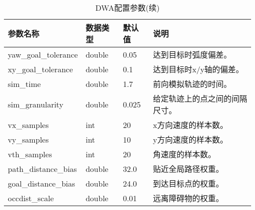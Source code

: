     \begin{table}[th]
      \caption{DWA配置参数(续)}  
      \begin{center}  
      \begin{tabular}{|l|l|l|p{8cm}|}  
      \hline  
      参数名称 & 数据类型 & 默认值 & 说明  \\ \hline  
      yaw\_goal\_tolerance & double & 0.05 & 达到目标时弧度偏差。 \\  \hline  
      xy\_goal\_tolerance & double & 0.1 & 达到目标时x/y轴的偏差。 \\  \hline  
      sim\_time & double & 1.7 & 前向模拟轨迹的时间。 \\  \hline  
      sim\_granularity & double & 0.025 & 给定轨迹上的点之间的间隔尺寸。 \\  \hline  
      vx\_samples & int & 20 & x方向速度的样本数。 \\  \hline  
      vy\_samples & int & 10 & y方向速度的样本数。 \\  \hline  
      vth\_samples & int & 20 & 角速度的样本数。 \\  \hline  
      path\_distance\_bias & double & 32.0 & 贴近全局路径权重。 \\  \hline  
      goal\_distance\_bias & double & 24.0 & 到达目标点的权重。 \\  \hline  
      occdist\_scale & double & 0.01 & 远离障碍物的权重。 \\  \hline  
    
      \end{tabular}  
      \end{center}  
      \end{table} 




